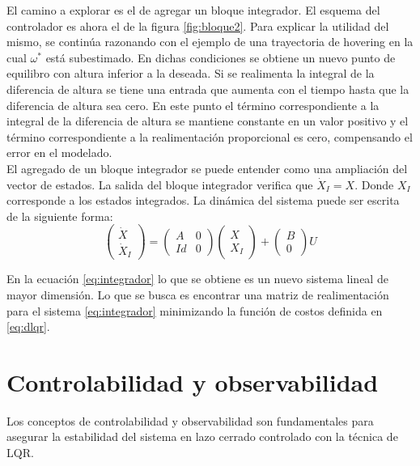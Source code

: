 \documentclass[main]{subfiles}
\begin{document}
El camino a explorar es el de agregar un bloque integrador. El esquema del controlador es ahora el de la figura \ref{fig:bloque2}. Para explicar la utilidad del mismo, se contin\'ua razonando con el ejemplo de una trayectoria de hovering en la cual $\omega^*$ est\'a subestimado. En dichas condiciones se obtiene un nuevo punto de equilibro con altura inferior a la deseada. Si se realimenta la integral de la diferencia de altura se tiene una entrada que aumenta con el tiempo hasta que la diferencia de altura sea cero. En este punto el t\'ermino correspondiente a la integral de la diferencia de altura se mantiene constante en un valor positivo y el t\'ermino correspondiente a la realimentaci\'on proporcional es cero, compensando el error en el modelado.\\

El agregado de un bloque integrador se puede entender como una ampliaci\'on del vector de estados. La salida del bloque integrador verifica que $\dot{X}_I = X$. Donde $X_I$ corresponde a los estados integrados. La din\'amica del sistema puede ser escrita de la siguiente forma:
\begin{equation}
\label{eq:integrador}
\left(\begin{array}{c}
\dot{X}\\
\dot{X}_I
\end{array}\right) = \left( \begin{array}{cc}
A & 0\\
Id & 0
\end{array}\right)\left(\begin{array}{c}
X\\
X_I
\end{array}\right) + \left(\begin{array}{c}
B\\
0
\end{array}\right)U
\end{equation}  
 
En la ecuaci\'on \ref{eq:integrador} lo que se obtiene es un nuevo sistema lineal de mayor dimensi\'on. Lo que se busca es encontrar una matriz de realimentaci\'on para el sistema \ref{eq:integrador} minimizando la funci\'on de costos definida en \ref{eq:dlqr}.

\section{Controlabilidad y observabilidad}

Los conceptos de controlabilidad y observabilidad son fundamentales para asegurar la estabilidad del sistema en lazo cerrado controlado con la t\'ecnica de LQR.\\
\end{document}
